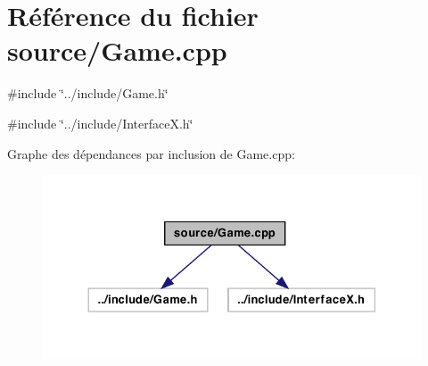 \hypertarget{a00003}{
\section{Référence du fichier source/Game.cpp}
\label{a00003}
}
{\ttfamily \#include \char`\"{}../include/Game.h\char`\"{}}\par
{\ttfamily \#include \char`\"{}../include/InterfaceX.h\char`\"{}}\par
Graphe des dépendances par inclusion de Game.cpp:
\nopagebreak
\begin{figure}[H]
\begin{center}
\leavevmode
\includegraphics[width=330pt]{a00010}
\end{center}
\end{figure}

